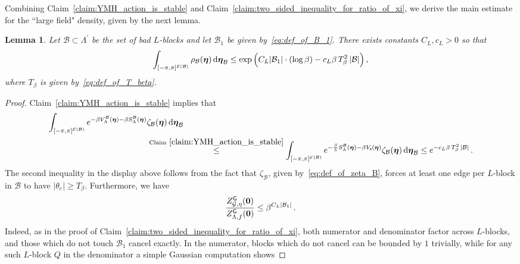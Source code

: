 \documentclass[11pt]{article}
\newtheorem{lemma}[theorem]{Lemma}
\theoremstyle{definition}
\theoremstyle{remark}
\numberwithin{theorem}{section}
\def\La{{\Lambda}}
\newcommand{\cE}{\mathcal{E}}
\newcommand{\cB}{\mathcal B}
\begin{document}
    Combining Claim~\ref{claim:YMH_action_is_stable} and Claim~\ref{claim:two_sided_inequality_for_ratio_of_xi}, we derive the main estimate for the ``large field" density, given by the next lemma.
    \begin{lemma}
        \label{lemma:estimate_on_integral_over_large_fields}
        Let $\cB\subset \La^\prime$ be the set of bad $L$-blocks and let $\mathcal{B}_1$ be given by~\eqref{eq:def_of_B_1}. There exists constants $C_L,c_L>0$ so that 
        \[
        \int_{[-\pi,\pi]^{\cE(\mathcal{B})}} \rho_{\mathcal{B}}(\boldsymbol{\eta}) \, {\rm d} \boldsymbol{\eta}_{\mathcal{B}} \le \exp\Big( C_L |\mathcal{B}_1| \cdot (\log \beta) - c_L \beta \, T_\beta^2  \, |\mathcal{B}| \Big) \, ,
        \]
        where $T_\beta$ is given by~\eqref{eq:def_of_T_beta}.
    \end{lemma}
    \begin{proof}
        Claim~\ref{claim:YMH_action_is_stable} implies that  
        \begin{align} \label{eq:proof_of_lemma:estimate_on_integral_over_large_fields_energy_estimate}
          \nonumber 
          \int_{[-\pi,\pi]^{\cE(\mathcal{B})}}  e^{-\beta V_{\Lambda}^{\mathcal{B}}(\boldsymbol{\eta})- \beta S_{\Lambda}^{\mathcal{B}}(\boldsymbol{\eta})} & \zeta_{\mathcal{B}}(\boldsymbol{\eta}) \, {\rm d} \boldsymbol{\eta}_{\mathcal{B}}  \\ &\stackrel{\text{Claim}~\ref{claim:YMH_action_is_stable}}{\le} \int_{[-\pi,\pi]^{\cE(\mathcal{B})}} e^{-\frac{\beta}{5} S_{\La}^{\mathcal{B}}(\boldsymbol{\eta}) - \beta V_{\sf s}(\boldsymbol{\eta}) } \zeta_{\mathcal{B}}(\boldsymbol{\eta}) \, {\rm d} \boldsymbol{\eta}_{\mathcal{B}}  \le e^{-c_L \beta  \, T_\beta^2 \, |\mathcal{B}|} \, .
        \end{align}
        The second inequality in the display above follows from the fact that $\zeta_{\mathcal{B}}$, given by~\eqref{eq:def_of_zeta_B}, forces at least one edge per $L$-block in $\cB$ to have $|\theta_e| \ge T_\beta$. Furthermore, we have
        \begin{equation} \label{eq:proof_of_lemma:estimate_on_integral_over_large_fields_ratio_of_gaussian_partitions}
            \frac{Z_{\mathcal{G},\eta}^{\sf G}(\mathbf{0})}{Z_{\Lambda,f}^{\sf G}(\mathbf{0})} \le \beta^{C_L |\mathcal{B}_1|} \, .            
        \end{equation}
        Indeed, as in the proof of Claim~\ref{claim:two_sided_inequality_for_ratio_of_xi}, both numerator and denominator factor across $L$-blocks, and those which do not touch $\mathcal{B}_1$ cancel exactly. In the numerator, blocks which do not cancel can be bounded by $1$ trivially, while for any such $L$-block $Q$ in the denominator a simple Gaussian computation shows

\end{proof}
\end{document}
